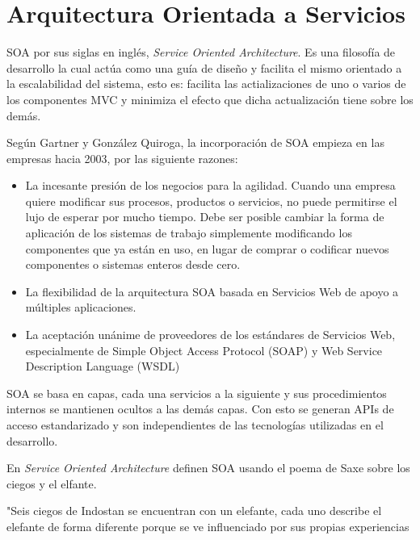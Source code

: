    \section{Arquitectura Orientada a Servicios}
    SOA por sus siglas en inglés, \textit{Service Oriented Architecture}. Es una filosofía de desarrollo la cual actúa como una guía de diseño y facilita el mismo orientado a la escalabilidad del sistema, esto es: facilita las actializaciones de uno o varios de los componentes MVC y minimiza el efecto que dicha actualización tiene sobre los demás.
    
    Según Gartner\cite{SOA-libroGartner} y González Quiroga\cite{SOA-tesis}, la incorporación de SOA empieza en las empresas hacia 2003, por las siguiente razones:
    
    \begin{itemize}
        \item La incesante presión de los negocios para la agilidad. Cuando una empresa quiere
        modificar sus procesos, productos o servicios, no puede permitirse el lujo de esperar por
        mucho tiempo. Debe ser posible cambiar la forma de aplicación de los sistemas de
        trabajo simplemente modificando los componentes que ya están en uso, en lugar de
        comprar o codificar nuevos componentes o sistemas enteros desde cero.
        
        \item La flexibilidad de la arquitectura SOA basada en Servicios Web de apoyo a múltiples
        aplicaciones.
        
        \item  La aceptación unánime de proveedores de los estándares de Servicios Web,
        especialmente de Simple Object Access Protocol (SOAP) y Web Service Description
        Language (WSDL)\cite{SOA-libroGartner}
        
    \end{itemize}
    
    SOA se basa en capas, cada una servicios a la siguiente y sus procedimientos internos se mantienen ocultos a las demás capas. Con esto se generan APIs de acceso estandarizado y son independientes de las tecnologías utilizadas en el desarrollo.
    
    En \textit{Service Oriented Architecture}\cite{SOA-msdn} definen SOA usando el poema de Saxe sobre los ciegos y el elfante.
    
    "Seis ciegos de Indostan se encuentran con un elefante, cada uno describe el elefante de forma diferente porque se ve influenciado por sus propias experiencias
    
